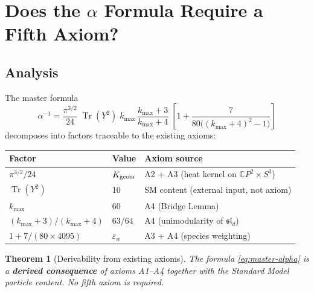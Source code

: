 \documentclass[11pt,a4paper]{article}
\newtheorem{theorem}{Theorem}
\newcommand{\Tr}{\operatorname{Tr}}
\newcommand{\CP}{\mathbb{C}P}
\newcommand{\slp}{\mathfrak{sl}}
\begin{document}
\section{Does the $\alpha$ Formula Require a Fifth Axiom?}

\subsection{Analysis}

The master formula
\begin{equation}
\alpha^{-1} = \frac{\pi^{3/2}}{24}\;\Tr(Y^2)\;k_{\max}\,\frac{k_{\max}+3}{k_{\max}+4}\;\left[1 + \frac{7}{80\bigl((k_{\max}+4)^2-1\bigr)}\right]
\label{eq:master-alpha}
\end{equation}
decomposes into factors traceable to the existing axioms:

\begin{center}
\begin{tabular}{lll}
\toprule
\textbf{Factor} & \textbf{Value} & \textbf{Axiom source} \\
\midrule
$\pi^{3/2}/24$ & $K_{\rm geom}$ & A2 + A3 (heat kernel on $\CP^2 \times S^3$) \\
$\Tr(Y^2)$ & 10 & SM content (external input, not axiom) \\
$k_{\max}$ & 60 & A4 (Bridge Lemma) \\
$(k_{\max}+3)/(k_{\max}+4)$ & $63/64$ & A4 (unimodularity of $\slp_d$) \\
$1 + 7/(80 \times 4095)$ & $\varepsilon_w$ & A3 + A4 (species weighting) \\
\bottomrule
\end{tabular}
\end{center}

\begin{theorem}[Derivability from existing axioms]
\label{thm:no-fifth}
The formula \eqref{eq:master-alpha} is a \textbf{derived consequence} of axioms A1--A4 together with the Standard Model particle content. No fifth axiom is required.
\end{theorem}
\end{document}
